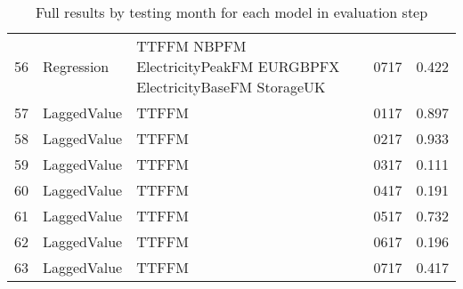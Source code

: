 \begin{table}[ht]
\begin{tabular}{rlllr}
  56 & Regression & TTFFM NBPFM ElectricityPeakFM EURGBPFX ElectricityBaseFM StorageUK & 0717 & 0.422 \\ 
  57 & LaggedValue & TTFFM  & 0117 & 0.897 \\ 
  58 & LaggedValue & TTFFM  & 0217 & 0.933 \\ 
  59 & LaggedValue & TTFFM  & 0317 & 0.111 \\ 
  60 & LaggedValue & TTFFM  & 0417 & 0.191 \\ 
  61 & LaggedValue & TTFFM  & 0517 & 0.732 \\ 
  62 & LaggedValue & TTFFM  & 0617 & 0.196 \\ 
  63 & LaggedValue & TTFFM  & 0717 & 0.417 \\ 
   \hline
\end{tabular}
\caption{Full results by testing month for each model in evaluation step} 
\label{tab:binary.eval.short}
\end{table}
